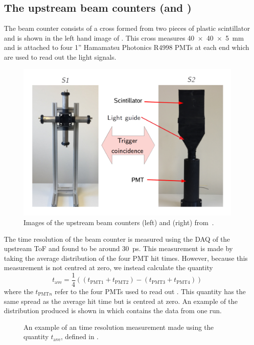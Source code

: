 \subsection{The upstream beam counters (\SOne and \STwo)}
\label{sec:hptpc_beam_flux:overview:s1s2}

The \SOne beam counter consists of a cross formed from two pieces of plastic scintillator and is shown in the left hand image of .
This cross measures \SI{40 x 40 x 5}{\milli\metre} and is attached to four 1'' Hamamatsu Photonics R4998 PMTs at each end which are used to read out the light signals.

\begin{figure}[h]
  \centering
  \includegraphics[width=.7\linewidth]{files/figures/hptpc_beam_flux/S1S2FrontOn}
  \caption[The upstream beam counters \SOne and \STwo]{Images of the upstream beam counters \SOne (left) and \STwo (right) from~\cite{beampaper}.}
  \label{fig:s1s2Pic}
\end{figure}

The time resolution of the \SOne beam counter is measured using the DAQ of the upstream ToF and found to be around \SI{30}{\pico\second}.
This measurement is made by taking the average distribution of the four PMT hit times. However, because this measurement is not centred at zero, we instead calculate the quantity
\begin{equation}
  t_{\text{ave}} = \frac{1}{4} ((t_{\text{PMT1}}+t_{\text{PMT2}}) - (t_{\text{PMT3}}+t_{\text{PMT4}}))
  \label{eq:tAve}
\end{equation}
where the $t_{\text{PMT}n}$ refer to the four PMTs used to read out \SOne.
This quantity has the same spread as the average hit time but is centred at zero.
An example of the distribution produced is shown in  which contains the data from one run.

\begin{figure}[h]
  \begin{adjustbox}{max totalsize=.7\textwidth, center}
    
  \end{adjustbox}
  \caption[Example of \SOne time resolution measurement]{An example of an \SOne time resolution measurement made using the quantity $t_{\text{ave}}$, defined in .}
  \label{fig:s1Res}
\end{figure}

